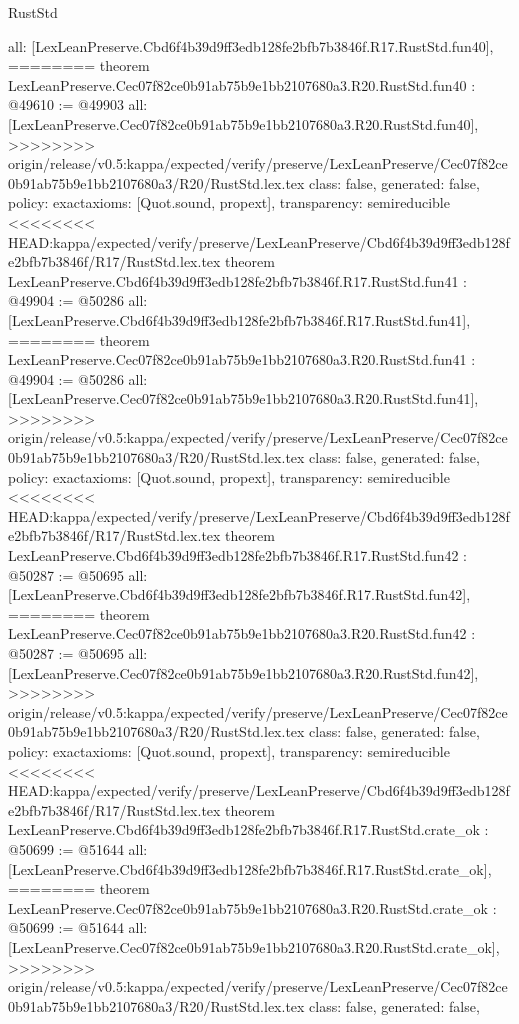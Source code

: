 \begin{lexlean}{RustStd}
\begin{coremodule}
{\begin{coremodule}
{{{{{{{{{{{{{{{{{{{{{{{{{{{{{{{{{{{{{{{{{{{  all: [LexLeanPreserve.Cbd6f4b39d9ff3edb128fe2bfb7b3846f.R17.RustStd.fun40],
========
theorem LexLeanPreserve.Cec07f82ce0b91ab75b9e1bb2107680a3.R20.RustStd.fun40 : @49610 := @49903 {
  all: [LexLeanPreserve.Cec07f82ce0b91ab75b9e1bb2107680a3.R20.RustStd.fun40],
>>>>>>>> origin/release/v0.5:kappa/expected/verify/preserve/LexLeanPreserve/Cec07f82ce0b91ab75b9e1bb2107680a3/R20/RustStd.lex.tex
  class: false,
  generated: false,
  policy: exact{axioms: [Quot.sound, propext]},
  transparency: semireducible
}
<<<<<<<< HEAD:kappa/expected/verify/preserve/LexLeanPreserve/Cbd6f4b39d9ff3edb128fe2bfb7b3846f/R17/RustStd.lex.tex
theorem LexLeanPreserve.Cbd6f4b39d9ff3edb128fe2bfb7b3846f.R17.RustStd.fun41 : @49904 := @50286 {
  all: [LexLeanPreserve.Cbd6f4b39d9ff3edb128fe2bfb7b3846f.R17.RustStd.fun41],
========
theorem LexLeanPreserve.Cec07f82ce0b91ab75b9e1bb2107680a3.R20.RustStd.fun41 : @49904 := @50286 {
  all: [LexLeanPreserve.Cec07f82ce0b91ab75b9e1bb2107680a3.R20.RustStd.fun41],
>>>>>>>> origin/release/v0.5:kappa/expected/verify/preserve/LexLeanPreserve/Cec07f82ce0b91ab75b9e1bb2107680a3/R20/RustStd.lex.tex
  class: false,
  generated: false,
  policy: exact{axioms: [Quot.sound, propext]},
  transparency: semireducible
}
<<<<<<<< HEAD:kappa/expected/verify/preserve/LexLeanPreserve/Cbd6f4b39d9ff3edb128fe2bfb7b3846f/R17/RustStd.lex.tex
theorem LexLeanPreserve.Cbd6f4b39d9ff3edb128fe2bfb7b3846f.R17.RustStd.fun42 : @50287 := @50695 {
  all: [LexLeanPreserve.Cbd6f4b39d9ff3edb128fe2bfb7b3846f.R17.RustStd.fun42],
========
theorem LexLeanPreserve.Cec07f82ce0b91ab75b9e1bb2107680a3.R20.RustStd.fun42 : @50287 := @50695 {
  all: [LexLeanPreserve.Cec07f82ce0b91ab75b9e1bb2107680a3.R20.RustStd.fun42],
>>>>>>>> origin/release/v0.5:kappa/expected/verify/preserve/LexLeanPreserve/Cec07f82ce0b91ab75b9e1bb2107680a3/R20/RustStd.lex.tex
  class: false,
  generated: false,
  policy: exact{axioms: [Quot.sound, propext]},
  transparency: semireducible
}
<<<<<<<< HEAD:kappa/expected/verify/preserve/LexLeanPreserve/Cbd6f4b39d9ff3edb128fe2bfb7b3846f/R17/RustStd.lex.tex
theorem LexLeanPreserve.Cbd6f4b39d9ff3edb128fe2bfb7b3846f.R17.RustStd.crate_ok : @50699 := @51644 {
  all: [LexLeanPreserve.Cbd6f4b39d9ff3edb128fe2bfb7b3846f.R17.RustStd.crate_ok],
========
theorem LexLeanPreserve.Cec07f82ce0b91ab75b9e1bb2107680a3.R20.RustStd.crate_ok : @50699 := @51644 {
  all: [LexLeanPreserve.Cec07f82ce0b91ab75b9e1bb2107680a3.R20.RustStd.crate_ok],
>>>>>>>> origin/release/v0.5:kappa/expected/verify/preserve/LexLeanPreserve/Cec07f82ce0b91ab75b9e1bb2107680a3/R20/RustStd.lex.tex
  class: false,
  generated: false,
}}}}}}}}}}}}}}}}}}}}}}}}}}}}}}}}}}}}}}}}}}}}}}}
\end{coremodule}}
\end{coremodule}
\end{lexlean}
